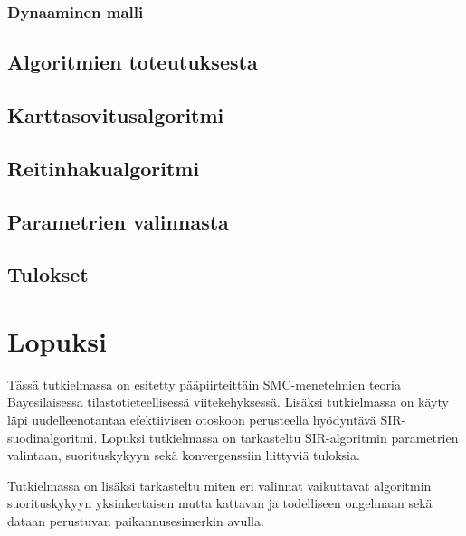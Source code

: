 \documentclass[
  12pt,
  a4paper, twoside]{book}
\begin{document}
\hypertarget{dynaaminen-malli}{%
\subsection{Dynaaminen malli}\label{dynaaminen-malli}}

\hypertarget{algoritmien-toteutuksesta}{%
\section{Algoritmien toteutuksesta}\label{algoritmien-toteutuksesta}}

\hypertarget{karttasovitusalgoritmi}{%
\section{Karttasovitusalgoritmi}\label{karttasovitusalgoritmi}}

\hypertarget{reitinhakualgoritmi}{%
\section{Reitinhakualgoritmi}\label{reitinhakualgoritmi}}

\hypertarget{parametrien-valinnasta}{%
\section{Parametrien valinnasta}\label{parametrien-valinnasta}}

\hypertarget{tulokset}{%
\section{Tulokset}\label{tulokset}}

\hypertarget{lopuksi}{%
\chapter{Lopuksi}\label{lopuksi}}

Tässä tutkielmassa on esitetty pääpiirteittäin SMC-menetelmien teoria Bayesilaisessa tilastotieteellisessä viitekehyksessä. Lisäksi tutkielmassa on käyty läpi uudelleenotantaa efektiivisen otoskoon perusteella hyödyntävä SIR-suodinalgoritmi. Lopuksi tutkielmassa on tarkasteltu SIR-algoritmin parametrien valintaan, suorituskykyyn sekä konvergenssiin liittyviä tuloksia.

Tutkielmassa on lisäksi tarkasteltu miten eri valinnat vaikuttavat algoritmin suorituskykyyn yksinkertaisen mutta kattavan ja todelliseen ongelmaan sekä dataan perustuvan paikannusesimerkin avulla.
\end{document}
